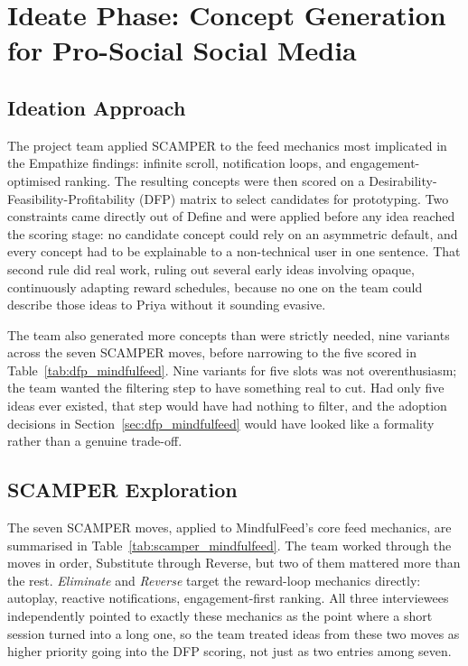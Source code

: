 \documentclass[11pt]{article}
\begin{document}
\section{Ideate Phase: Concept Generation for Pro-Social Social Media}

\subsection{Ideation Approach}
The project team applied SCAMPER to the feed mechanics most implicated in the Empathize findings: infinite scroll, notification loops, and engagement-optimised ranking. The resulting concepts were then scored on a Desirability-Feasibility-Profitability (DFP) matrix to select candidates for prototyping. Two constraints came directly out of Define and were applied before any idea reached the scoring stage: no candidate concept could rely on an asymmetric default, and every concept had to be explainable to a non-technical user in one sentence. That second rule did real work, ruling out several early ideas involving opaque, continuously adapting reward schedules, because no one on the team could describe those ideas to Priya without it sounding evasive.

The team also generated more concepts than were strictly needed, nine variants across the seven SCAMPER moves, before narrowing to the five scored in Table~\ref{tab:dfp_mindfulfeed}. Nine variants for five slots was not overenthusiasm; the team wanted the filtering step to have something real to cut. Had only five ideas ever existed, that step would have had nothing to filter, and the adoption decisions in Section~\ref{sec:dfp_mindfulfeed} would have looked like a formality rather than a genuine trade-off.

\subsection{SCAMPER Exploration}
\label{sec:scamper_mindfulfeed}
The seven SCAMPER moves, applied to MindfulFeed's core feed mechanics, are summarised in Table~\ref{tab:scamper_mindfulfeed}. The team worked through the moves in order, Substitute through Reverse, but two of them mattered more than the rest. \textit{Eliminate} and \textit{Reverse} target the reward-loop mechanics directly: autoplay, reactive notifications, engagement-first ranking. All three interviewees independently pointed to exactly these mechanics as the point where a short session turned into a long one, so the team treated ideas from these two moves as higher priority going into the DFP scoring, not just as two entries among seven.
\end{document}
